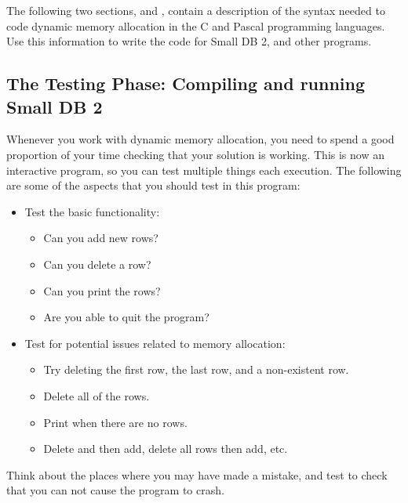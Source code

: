The following two sections,   and   , contain a description of the syntax needed to code dynamic memory allocation in the C and Pascal programming languages. Use this information to write the code for Small DB 2, and other programs.


\subsection{The Testing Phase: Compiling and running Small DB 2} %
\label{ssub:the_testing_phase_compiling_and_running_small_db_2}

Whenever you work with dynamic memory allocation, you need to spend a good proportion of your time checking that your solution is working. This is now an interactive program, so you can test multiple things each execution. The following are some of the aspects that you should test in this program:

\begin{itemize}
  \item Test the basic functionality:
  \begin{itemize}
    \item Can you add new rows?
    \item Can you delete a row?
    \item Can you print the rows?
    \item Are you able to quit the program?
  \end{itemize}
  \item Test for potential issues related to memory allocation:
  \begin{itemize}
    \item Try deleting the first row, the last row, and a non-existent row.
    \item Delete all of the rows.
    \item Print when there are no rows.
    \item Delete and then add, delete all rows then add, etc.
  \end{itemize}
\end{itemize}

Think about the places where you may have made a mistake, and test to check that you can not cause the program to crash. 


